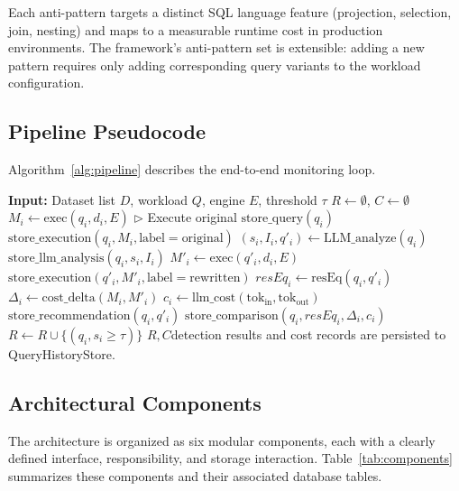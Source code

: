 \documentclass[conference]{IEEEtran}
\begin{document}
Each anti-pattern targets a distinct SQL language feature (projection, selection, join, nesting) and maps to a measurable runtime cost in production environments. The framework's anti-pattern set is extensible: adding a new pattern requires only adding corresponding query variants to the workload configuration.

\subsection{Pipeline Pseudocode}
Algorithm~\ref{alg:pipeline} describes the end-to-end monitoring loop.

\begin{algorithm}[t]
\caption{LLM-Powered Query Monitoring Pipeline}
\label{alg:pipeline}
\begin{algorithmic}
\STATE \textbf{Input:} Dataset list $D$, workload $Q$, engine $E$, threshold $\tau$
\STATE $R \gets \emptyset$, $C \gets \emptyset$
  \STATE $M_i \gets \text{exec}(q_i, d_i, E)$ \hfill $\triangleright$ Execute original
  \STATE $\text{store\_query}(q_i)$
  \STATE $\text{store\_execution}(q_i, M_i, \text{label}=\text{original})$
  \STATE $(s_i, I_i, q'_i) \gets \text{LLM\_analyze}(q_i)$
  \STATE $\text{store\_llm\_analysis}(q_i, s_i, I_i)$
    \STATE $M'_i \gets \text{exec}(q'_i, d_i, E)$
    \STATE $\text{store\_execution}(q'_i, M'_i, \text{label}=\text{rewritten})$
    \STATE $\textit{resEq}_i \gets \text{resEq}(q_i, q'_i)$
    \STATE $\Delta_i \gets \text{cost\_delta}(M_i, M'_i)$
    \STATE $c_i \gets \text{llm\_cost}(\text{tok}_{\text{in}}, \text{tok}_{\text{out}})$
    \STATE $\text{store\_recommendation}(q_i, q'_i)$
    \STATE $\text{store\_comparison}(q_i, \textit{resEq}_i, \Delta_i, c_i)$
  \ENDIF
  \STATE $R \gets R \cup \{(q_i, s_i \geq \tau)\}$
\ENDFOR
\RETURN $R, C$\textemdash detection results and cost records are persisted to QueryHistoryStore.
\end{algorithmic}
\end{algorithm}

\subsection{Architectural Components}
The architecture is organized as six modular components, each with a clearly defined interface, responsibility, and storage interaction. Table~\ref{tab:components} summarizes these components and their associated database tables.
\end{document}

